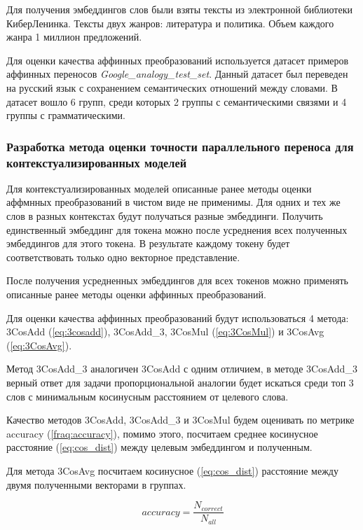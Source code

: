 \documentclass[a4paper,14pt]{article}
\begin{document}
Для получения эмбеддингов слов были взяты тексты из электронной библиотеки КиберЛенинка.
Тексты двух жанров: литература и политика.
Объем каждого жанра 1 миллион предложений.

Для оценки качества аффинных преобразований используется датасет примеров аффинных переносов \textit{Google\_analogy\_test\_set}.
Данный датасет был переведен на русский язык с сохранением семантических отношений между словами.
В датасет вошло 6 групп, среди которых 2 группы с семантическими связями и 4 группы с грамматическими.

\subsubsection{Разработка метода оценки точности параллельного переноса для контекстуализированных моделей}

Для контекстуализированных моделей описанные ранее методы оценки аффмнных преобразований в чистом виде не применимы.
Для одних и тех же слов в разных контекстах будут получаться разные эмбеддинги.
Получить единственный эмбеддинг для токена можно после усреднения всех полученных эмбеддингов для этого токена.
В результате каждому токену будет соответствовать только одно векторное представление.

После получения усредненных эмбеддингов для всех токенов можно применять описанные ранее методы оценки аффинных преобразований.



Для оценки качества аффинных преобразований будут использоваться 4 метода: 3CosAdd (\ref{eq:3cosadd}), 3CosAdd\_3,  3CosMul (\ref{eq:3CosMul}) и 3CosAvg (\ref{eq:3CosAvg}).

Метод 3CosAdd\_3 аналогичен 3CosAdd с одним отличием, в методе 3CosAdd\_3 верный ответ для задачи пропорциональной аналогии будет искаться среди топ 3 слов с минимальным косинусным расстоянием от целевого слова.

Качество методов 3CosAdd, 3CosAdd\_3 и 3CosMul будем оценивать по метрике accuracy (\ref{fraq:accuracy}), помимо этого, посчитаем среднее косинусное расстояние (\ref{eq:cos_dist}) между целевым эмбеддингом и полученным. 

Для метода 3CosAvg посчитаем косинусное (\ref{eq:cos_dist}) расстояние между двумя полученными векторами в группах.

\begin{equation}
	accuracy = \dfrac{N_{correct}}{N_{all}}
	\label{fraq:accuracy}
\end{equation}
\end{document}
